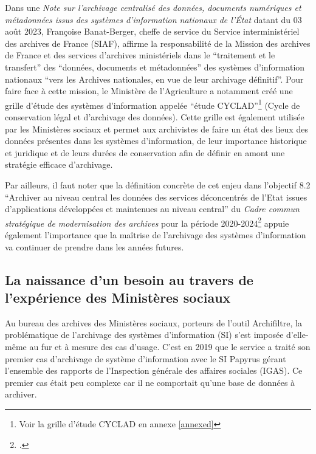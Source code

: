 Dans une \textit{Note sur l'archivage centralisé des données, documents numériques et métadonnées issus des systèmes d'information nationaux de l'État} datant du 03 août 2023, Françoise Banat-Berger, cheffe de service du Service interministériel des archives de France (SIAF), affirme la responsabilité de la Mission des archives de France et des services d’archives ministériels dans le \enquote{traitement et le transfert} des \enquote{données, documents et métadonnées} des systèmes d’information nationaux \enquote{vers les Archives nationales, en vue de leur archivage définitif}. Pour faire face à cette mission, le Ministère de l’Agriculture a notamment créé une grille d’étude des systèmes d’information appelée \enquote{étude CYCLAD}\footnote{Voir la grille d'étude CYCLAD en annexe \ref{annexed}} (Cycle de conservation légal et d'archivage des données). Cette grille est également utilisée par les Ministères sociaux et permet aux archivistes de faire un état des lieux des données présentes dans les systèmes d’information, de leur importance historique et juridique et de leurs durées de conservation afin de définir en amont une stratégie efficace d’archivage. 


Par ailleurs, il faut noter que la définition concrète de cet enjeu dans l’objectif 8.2 \enquote{Archiver au niveau central les données des services déconcentrés de l’Etat issues d’applications développées et maintenues au niveau central} du \textit{Cadre commun stratégique de modernisation des archives} pour la période 2020-2024\footcite{noauthor_cadre_nodate} appuie également l’importance que la maîtrise de l’archivage des systèmes d’information va continuer de prendre dans les années futures.

\subsection{La naissance d’un besoin au travers de l’expérience des Ministères sociaux}
\label{part2.chap2.2}

Au bureau des archives des Ministères sociaux, porteurs de l’outil \gls{Archifiltre}, la problématique de l’archivage des systèmes d’information (\gls{SI}) s’est imposée d'elle-même au fur et à mesure des cas d’usage. C’est en 2019 que le service a traité son premier cas d’archivage de système d’information avec le \gls{SI} Papyrus gérant l’ensemble des rapports de l’Inspection générale des affaires sociales (IGAS). Ce premier cas était peu complexe car il ne comportait qu’une base de données à archiver. 


